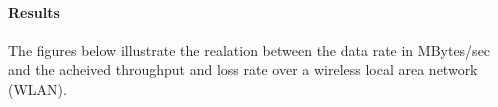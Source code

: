 \documentclass[aps,letterpaper,10pt]{revtex4}
\begin{document}
            \vspace{3mm}
            
            \paragraph{Results}
                The figures below illustrate the realation between the data rate in MBytes/sec and the acheived throughput and loss rate over a wireless local area network (WLAN).
                \begin{figure}[htp]
                    \begin{center}
                \end{center}
            \end{figure}
            
\end{document}
